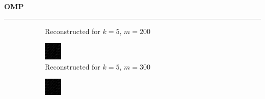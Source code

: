 \documentclass[a4paper,12pt]{article}
\newenvironment{solution}[2][]{%
    \begin{mdframed}[linecolor=blue!70!black, linewidth=2pt, roundcorner=10pt, backgroundcolor=yellow!10!white, skipabove=12pt, skipbelow=12pt]%
        \textbf{\large #2}
        \par\noindent\rule{\textwidth}{0.4pt}
}{
    \end{mdframed}
}
\begin{document}
\begin{solution}{OMP}
\begin{figure}[H]
\begin{subfigure}[t]{0.23\textwidth}
        \caption{Reconstructed for $k = 5$, $m = 200$}
    \end{subfigure}
    \begin{subfigure}[t]{0.23\textwidth}
        \centering
        \includegraphics[width=\textwidth]{../images/omp/Reconstructed_k_5_m_300.png}
        \caption{Reconstructed for $k = 5$, $m = 300$}
    \end{subfigure}
    \begin{subfigure}[t]{0.23\textwidth}
        \centering
        \includegraphics[width=\textwidth]{../images/omp/Reconstructed_k_5_m_400.png}

\end{subfigure}
\end{figure}
\end{solution}
\end{document}
